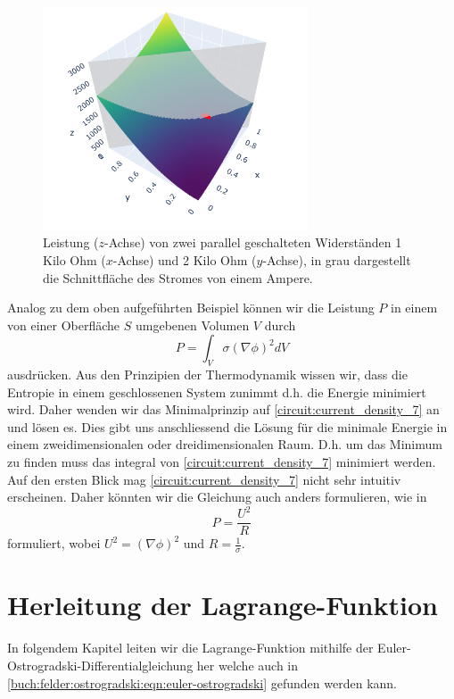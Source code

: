 \begin{figure}
	\centering
	\includegraphics[width=0.7\textwidth]{papers/circuit/two_parrallel_resistors.png}
	\caption{Leistung ($z$-Achse) von zwei parallel geschalteten Widerständen 1 Kilo Ohm ($x$-Achse) und 2 Kilo Ohm ($y$-Achse), in grau dargestellt die Schnittfläche des Stromes von einem Ampere.}
	\label{fig:circuit_power}
\end{figure}

Analog zu dem oben aufgeführten Beispiel können wir die Leistung $P$ in einem von einer Oberfläche $S$ umgebenen Volumen $V$ durch 
\begin{equation}
	P=\int_V \sigma(\nabla \phi)^2 d V
	\label{circuit:current_density_7}
\end{equation}
ausdrücken. Aus den Prinzipien der Thermodynamik wissen wir, dass die Entropie in einem geschlossenen System zunimmt d.h. die Energie minimiert wird. Daher wenden wir das Minimalprinzip auf \eqref{circuit:current_density_7} an und lösen es. Dies gibt uns anschliessend die Lösung für die minimale Energie in einem zweidimensionalen oder dreidimensionalen Raum. D.h. um das Minimum zu finden muss das integral von \eqref{circuit:current_density_7} minimiert werden. Auf den ersten Blick mag \eqref{circuit:current_density_7} nicht sehr intuitiv erscheinen. Daher könnten wir die Gleichung auch anders formulieren, wie in 
\begin{equation}
	P=\frac{U^2}{R}
	\label{circuit:current_density_8}
\end{equation}
formuliert, wobei $U^2=\left( \nabla \phi \right)^2$ und $R=\frac{1}{\sigma}$.


\section{Herleitung der Lagrange-Funktion}
In folgendem Kapitel leiten wir die Lagrange-Funktion mithilfe der Euler-Ostrogradski-Differentialgleichung her welche auch in \eqref{buch:felder:ostrogradski:eqn:euler-ostrogradski} gefunden werden kann.


